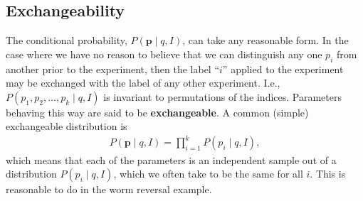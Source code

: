 \subsection{Exchangeability}
The conditional probability, $P(\mathbf{p}\mid q, I)$, can take any
reasonable form.  In the case where we have no reason to believe that
we can distinguish any one $p_i$ from another prior to the experiment,
then the label ``$i$'' applied to the experiment may be exchanged with
the label of any other experiment.  I.e.,
$P(p_1, p_2, \ldots, p_k \mid q, I)$ is invariant to permutations of
the indices.  Parameters behaving this way are said to be
\textbf{exchangeable}.  A common (simple) exchangeable distribution is
\begin{align}
P(\mathbf{p}\mid q, I) = \prod_{i=1}^k P(p_i\mid q, I),
\end{align}
which means that each of the parameters is an independent sample out
of a distribution $P(p_i\mid q, I)$, which we often take to be the same
for all $i$.  This is reasonable to do in the worm reversal example.


